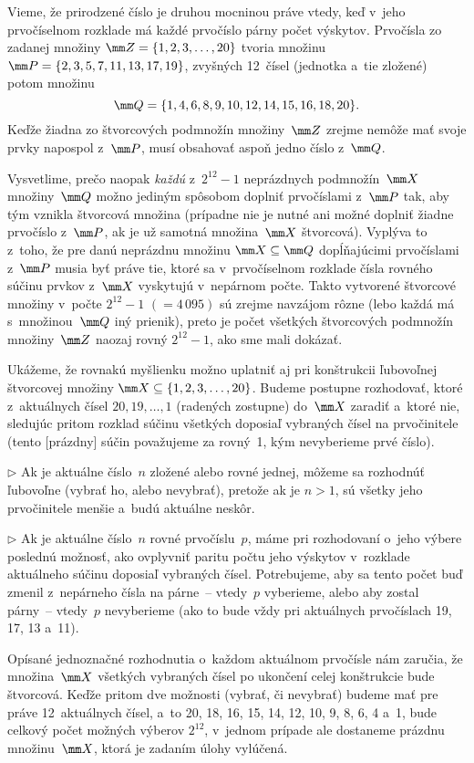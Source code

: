 {%
Vieme, že prirodzené číslo je druhou mocninou práve vtedy,
keď v~jeho prvočíselnom rozklade má každé prvočíslo párny
počet výskytov. Prvočísla zo zadanej množiny $\mm Z=\{1,2,3,\dots,20\}$
tvoria množinu $\mm P=\{2,3,5,7,11,13,17,19\}$, zvyšných 12~čísel
(jednotka a~tie zložené) potom množinu
$$
\mm Q=\{1,4,6,8,9,10,12,14,15,16,18,20\}.
$$
Keďže žiadna zo štvorcových podmnožín množiny~$\mm Z$ zrejme nemôže mať
svoje prvky napospol z~$\mm P$, musí obsahovať aspoň jedno číslo z~$\mm Q$.

Vysvetlime, prečo naopak {\it každú\/}
z~$2^{12}-1$ neprázdnych podmnožín~$\mm X$ množiny~$\mm Q$ možno jediným spôsobom
doplniť prvočíslami z~$\mm P$ tak, aby tým vznikla štvorcová
množina (prípadne nie je nutné ani možné doplniť žiadne prvočíslo z~$\mm P$,
ak je už samotná množina~$\mm X$ štvorcová).
Vyplýva to z~toho, že pre danú neprázdnu množinu $\mm X\subseteq \mm Q$
dopĺňajúcimi prvočíslami z~$\mm P$ musia byť práve tie, ktoré sa v~prvočíselnom
rozklade čísla rovného súčinu prvkov z~$\mm X$ vyskytujú v~nepárnom počte.
Takto vytvorené štvorcové množiny v~počte $2^{12}-1$ $(=4\,095)$
sú zrejme navzájom rôzne (lebo
každá má s~množinou~$\mm Q$ iný prienik),
preto je počet všetkých
štvorcových podmnožín množiny~$\mm Z$ naozaj rovný $2^{12}-1$, ako
sme mali dokázať.

\ineres
Ukážeme, že rovnakú myšlienku možno uplatniť aj pri konštrukcii
ľubovoľnej štvorcovej množiny
$\mm X\subseteq\{1,2,3,\dots,20\}$. Budeme
postupne rozhodovať, ktoré z~aktuálnych čísel $20,19,\dots,1$ (radených zostupne)
do~$\mm X$ zaradiť a~ktoré nie, sledujúc pritom rozklad súčinu všetkých
doposiaľ vybraných čísel na prvočinitele (tento [prázdny] súčin považujeme za
rovný~1, kým nevyberieme prvé číslo).

\item{$\triangleright$}
Ak je aktuálne číslo~$n$ zložené alebo rovné jednej, môžeme sa rozhodnúť
ľubovoľne (vybrať ho, alebo nevybrať), pretože ak je $n>1$, sú všetky jeho
prvočinitele menšie a~budú aktuálne neskôr.
\item{$\triangleright$}
Ak je aktuálne číslo~$n$ rovné prvočíslu~$p$,
máme pri rozhodovaní o~jeho výbere poslednú možnosť,
ako ovplyvniť paritu počtu jeho výskytov v~rozklade aktuálneho súčinu
doposiaľ vybraných čísel. Potrebujeme, aby sa
tento počet buď zmenil z~nepárneho čísla na párne~-- vtedy~$p$ vyberieme,
alebo aby zostal párny~-- vtedy~$p$ nevyberieme (ako to bude vždy
pri aktuálnych prvočíslach 19, 17, 13 a~11).

\noindent
Opísané jednoznačné rozhodnutia o~každom aktuálnom prvočísle nám
zaručia, že množina~$\mm X$ všetkých vybraných čísel
po ukončení celej konštrukcie bude štvorcová.
Keďže pritom dve možnosti (vybrať, či nevybrať) budeme mať pre
práve 12~aktuálnych čísel, a~to 20, 18, 16, 15, 14, 12, 10, 9, 8, 6, 4 a~1,
bude celkový počet možných výberov $2^{12}$,
v~jednom prípade ale dostaneme prázdnu množinu~$\mm X$, ktorá je zadaním
úlohy vylúčená.

}
